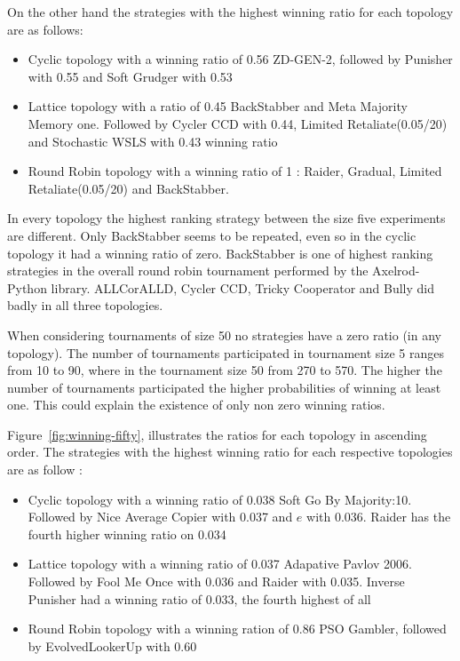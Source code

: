 On the other hand the strategies with the highest winning ratio for each
topology are as follows:

\begin{itemize}
  \item Cyclic topology with a winning ratio of 0.56 ZD-GEN-2, followed by Punisher
        with 0.55 and Soft Grudger with 0.53
  \item Lattice topology with a ratio of 0.45 BackStabber and Meta Majority
        Memory one. Followed by Cycler CCD with 0.44, Limited Retaliate(0.05/20)
        and Stochastic WSLS with 0.43 winning ratio
  \item Round Robin topology with a winning ratio of 1 : Raider, Gradual, Limited
        Retaliate(0.05/20) and BackStabber.
\end{itemize}

In every topology the highest ranking strategy between the size five experiments
are different. Only BackStabber seems to be repeated, even so in the cyclic
topology it had a winning ratio of zero. BackStabber is one of highest ranking
strategies in the overall round robin tournament performed by the Axelrod-Python
library. ALLCorALLD, Cycler CCD, Tricky Cooperator and Bully did badly in all
three topologies.

When considering tournaments of size 50 no strategies have a zero ratio
(in any topology). The number of tournaments participated in tournament size 5
ranges from 10 to 90, where in the tournament size 50 from 270 to 570. The higher
the number of tournaments participated the higher probabilities of winning at
least one. This could explain the existence of only non zero winning ratios.

Figure~\ref{fig:winning-fifty}, illustrates the ratios for each topology in
ascending order. The strategies with the highest winning ratio
for each respective topologies are as follow :

\begin{itemize}
  \item Cyclic topology with a winning ratio of 0.038 Soft Go By Majority:10.
        Followed by Nice Average Copier with 0.037 and \(e\) with 0.036. Raider
        has the fourth higher winning ratio on 0.034
  \item Lattice topology with a winning ratio of 0.037 Adapative Pavlov 2006.
        Followed by Fool Me Once with 0.036 and Raider with 0.035. Inverse
        Punisher had a winning ratio of 0.033, the fourth highest of all
  \item Round Robin topology with a winning ration of 0.86 PSO Gambler, followed
        by EvolvedLookerUp with 0.60
\end{itemize}

